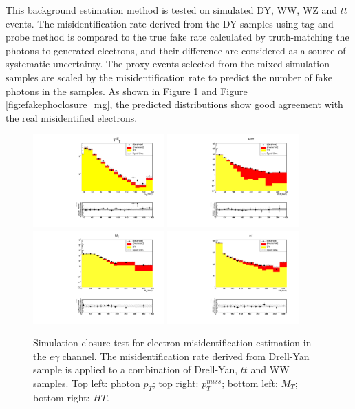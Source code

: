 \documentclass[thesis.tex]{subfiles}
\renewcommand\_{\textunderscore\allowbreak}
\begin{document}
   This background estimation method is tested on simulated DY, WW, WZ and $t\bar{t}$ events. The misidentification rate derived from the DY samples using tag and probe method is compared to the true fake rate calculated by truth-matching the photons to generated electrons, and their difference are considered as a source of systematic uncertainty. The proxy events selected from the mixed simulation samples are scaled by the misidentification rate to predict the number of fake photons in the samples. As shown in Figure \ref{fig:efakephoclosure_egamma} and Figure \ref{fig:efakephoclosure_mg}, the predicted distributions show good agreement with the real misidentified electrons.  

\begin{figure}
  \centering
    \includegraphics[width=0.45\textwidth]{Figures/closure_elefakepho_PhotonEt_egamma.pdf}
    \includegraphics[width=0.45\textwidth]{Figures/closure_elefakepho_MET_egamma.pdf}
    \includegraphics[width=0.45\textwidth]{Figures/closure_elefakepho_MT_egamma.pdf}
    \includegraphics[width=0.45\textwidth]{Figures/closure_elefakepho_HT_egamma.pdf}
  \caption{Simulation closure test for electron misidentification estimation in the $e\gamma$ channel. The misidentification rate derived from Drell-Yan sample is applied to a combination of Drell-Yan, $t\bar{t}$ and WW samples. Top left: photon $p_T$; top right: $p_T^{miss}$; bottom left: $M_T$; bottom right: $HT$.}
  \label{fig:efakephoclosure_egamma}
\end{figure}
\end{document}
